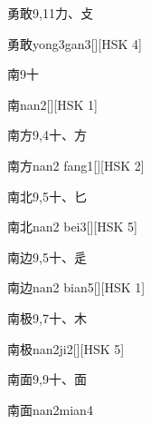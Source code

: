 \begin{entry}{勇敢}{9,11}{⼒、⽁}
  \begin{phonetics}{勇敢}{yong3gan3}[][HSK 4]
  \end{phonetics}
\end{entry}

\begin{entry}{南}{9}{⼗}
  \begin{phonetics}{南}{nan2}[][HSK 1]
  \end{phonetics}
\end{entry}

\begin{entry}{南方}{9,4}{⼗、⽅}
  \begin{phonetics}{南方}{nan2 fang1}[][HSK 2]
  \end{phonetics}
\end{entry}

\begin{entry}{南北}{9,5}{⼗、⼔}
  \begin{phonetics}{南北}{nan2 bei3}[][HSK 5]
  \end{phonetics}
\end{entry}

\begin{entry}{南边}{9,5}{⼗、⾡}
  \begin{phonetics}{南边}{nan2 bian5}[][HSK 1]
  \end{phonetics}
\end{entry}

\begin{entry}{南极}{9,7}{⼗、⽊}
  \begin{phonetics}{南极}{nan2ji2}[][HSK 5]
  \end{phonetics}
\end{entry}

\begin{entry}{南面}{9,9}{⼗、⾯}
  \begin{phonetics}{南面}{nan2mian4}
  \end{phonetics}
\end{entry}

